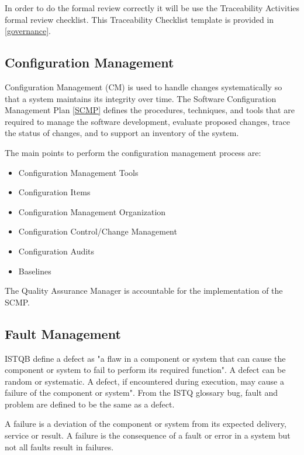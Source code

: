 \documentclass{template/openetcs_article}
\begin{document}
In order to do the formal review correctly it will be use the Traceability Activities formal review checklist. This Traceability Checklist template is provided in \href{https://github.com/openETCS/governance/tree/master/Templates}{[governance]}.

\subsection{Configuration Management}

Configuration Management (CM) is used to handle changes systematically so that a system maintains its integrity over time. The Software Configuration Management Plan  \href{https://github.com/openETCS/governance/blob/master/SCMP/SCMP_0.0.0.pdf}{[SCMP]} defines the procedures, techniques, and tools that are required to manage the software development, evaluate proposed changes, trace the status of changes, and to support an inventory of the system. 

The main points to perform the configuration management process are:

\vspace{-10pt}
\begin{itemize}
\item Configuration Management Tools
\item Configuration Items
\item Configuration Management Organization
\item Configuration Control/Change Management
\item Configuration Audits
\item Baselines
\end{itemize}

The Quality Assurance Manager is accountable for the implementation of the \gls{SCMP}.

\subsection{Fault Management}

\gls{ISTQB} define a defect as "a flaw in a component or system that can cause the component or system to fail to perform its required function". A defect can be random or systematic. A defect, if encountered during execution, may cause a failure of the component or system". From the ISTQ glossary bug, fault and problem are defined to be the same as a defect.

A failure is a deviation of the component or system from its expected delivery, service or result. A failure is the consequence of a fault or error in a system but not all faults result in failures.
\end{document}
